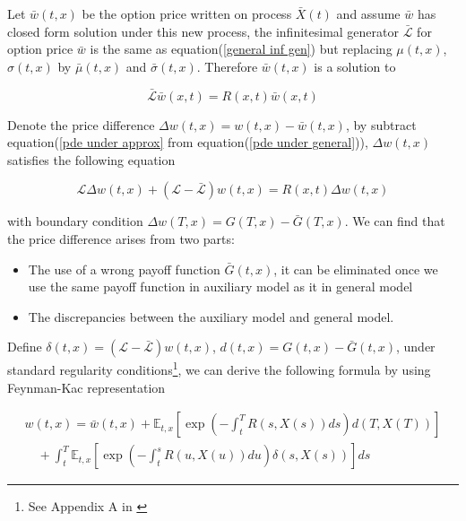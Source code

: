 Let $\bar{w}(t,x)$ be the option price written on process $\bar{X}(t)$ and assume $\bar{w}$ has closed form solution under this new process, the infinitesimal generator $\bar{\mathcal{L}}$ for option price $\bar{w}$ is the same as equation(\ref{general inf gen}) but replacing $\mu(t,x)$, $\sigma(t,x)$ by $\bar{\mu}(t,x)$ and $\bar{\sigma}(t,x)$. Therefore $\bar{w}(t,x)$ is a solution to

\begin{equation}\label{pde under approx}
    \mathcal{\bar{L}}\bar{w}(x,t) = R(x,t)\bar{w}(x,t)
\end{equation}

Denote the price difference $\Delta w(t,x) = w(t,x) - \bar{w}(t,x)$, by subtract equation(\ref{pde under approx} from equation(\ref{pde under general})), $\Delta w(t,x)$ satisfies the following equation

\begin{equation}
    \mathcal{L} \Delta w(t, x)+ (\mathcal{L}-\bar{\mathcal{L}}) w(t,x)=R(x, t) \Delta w(t, x)
\end{equation}

\noindent with boundary condition $\Delta w(T,x) = G(T,x) - \bar{G}(T,x)$. We can find that the price difference arises from two parts:

\begin{itemize}
    \item The use of a wrong payoff function $\bar{G}(t,x)$, it can be eliminated once we use the same payoff function in auxiliary model as it in general model
    \item The discrepancies between the auxiliary model and general model.
\end{itemize}

\noindent Define $\delta(t,x) = (\mathcal{L}-\bar{\mathcal{L}}) w(t,x)$, $d(t,x) = G(t,x) - \bar{G}(t,x)$, under standard regularity conditions\footnote{See Appendix A in \cite{kristensen_adding_2011}}, we can derive the following formula by using Feynman-Kac representation

\begin{equation}\label{feynman-kac rep}
    \begin{gathered}
        w(t, x)=\bar{w}(t,x)+\mathbb{E}_{t,x}\left[\exp \left(-\int_{t}^{T} R(s,X(s)) d s\right) d(T,X(T))\right] \\
        \quad+\int_{t}^{T} \mathbb{E}_{t,x}\left[\exp \left(-\int_{t}^{s} R(u, X(u)) d u\right) \delta(s,X(s))\right] d s
        \end{gathered}
\end{equation}

